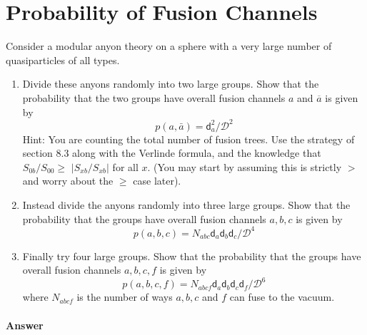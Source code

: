 \section{Probability of Fusion Channels}
Consider a modular anyon theory on a sphere with a very large number of quasiparticles of all types.
\begin{enumerate}
\item Divide these anyons randomly into two large groups. Show that the probability that the two groups have overall fusion channels $a$ and $\overline{a}$ is given by\begin{equation*}
p(a,\bar{a} )=\mathsf{d}_{a}^{2} /\mathcal{D}^{2}
\end{equation*}Hint: You are counting the total number of fusion trees. Use the strategy of section 8.3 along with the Verlinde formula, and the knowledge that $S_{0b} /S_{00} \geq $ $| S_{xb} /S_{xb}| $ for all $x$. (You may start by assuming this is strictly $ >$ and worry about the $\geq $ case later).
\item Instead divide the anyons randomly into three large groups. Show that the probability that the groups have overall fusion channels $a,b,c$ is given by\begin{equation*}
p(a,b,c)=N_{abc}\mathsf{d}_{a}\mathsf{d}_{b}\mathsf{d}_{c} /\mathcal{D}^{4}
\end{equation*}
\item Finally try four large groups. Show that the probability that the groups have overall fusion channels $a,b,c,f$ is given by\begin{equation*}
p(a,b,c,f)=N_{abcf}\mathsf{d}_{a}\mathsf{d}_{b}\mathsf{d}_{c}\mathsf{d}_{f} /\mathcal{D}^{6}
\end{equation*}where $N_{abcf}$ is the number of ways $a,b,c$ and $f$ can fuse to the vacuum.
\end{enumerate}

\paragraph{Answer}



